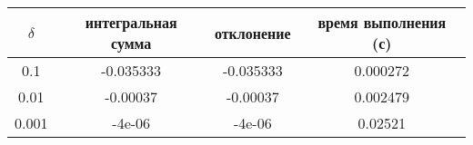 \begin{tabular}{|c|c|c|c|}
    \hline
    $\delta$ & интегральная сумма & отклонение & время выполнения (с)\\
    \hline
    0.1 & -0.035333 & -0.035333 & 0.000272\\
    \hline
    0.01 & -0.00037 & -0.00037 & 0.002479\\
    \hline
    0.001 & -4e-06 & -4e-06 & 0.02521\\
    \hline
\end{tabular}